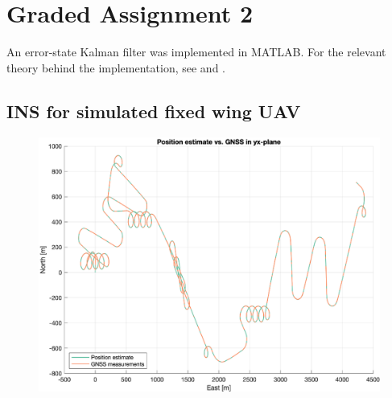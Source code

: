 \section{Graded Assignment 2}\label{sec:graded_assignment_2}


An error-state Kalman filter was implemented in MATLAB. For the relevant theory behind the implementation, see \cite{Sola} and \cite{Edmund}.

\subsection{INS for simulated fixed wing UAV}

\begin{figure}[!htb]
    \centering
    \includegraphics[width=0.6\linewidth]{figures/ga_2/sim_trajectory.eps}
    \caption{}
    \label{fig:ga_2_sim_trajectory}
\end{figure}

